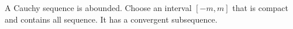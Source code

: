 \begin{theorem}
    A Cauchy sequence is abounded. Choose an interval $[-m, m]$ that is compact and contains all sequence. It has a convergent subsequence.
\end{theorem}














































































































